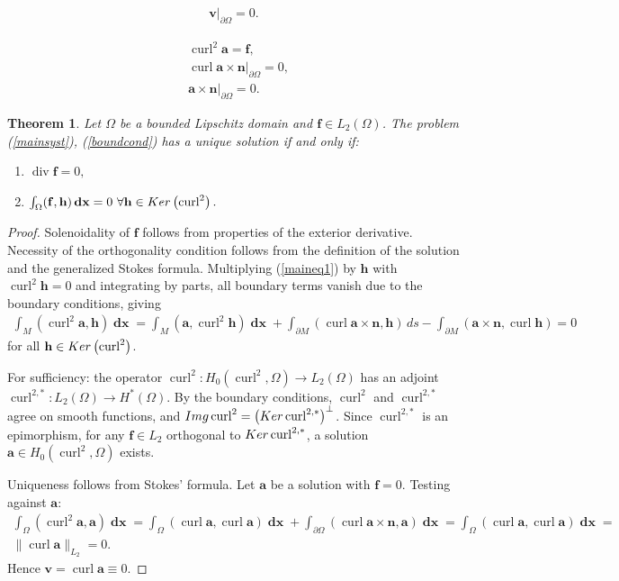\documentclass[10pt,a4paper]{amsart}
\newtheorem{theorem}{Theorem}
\newcommand{\Img}{{\rm Img}}
\newcommand{\Ker}{{\rm Ker}}
\newcommand{\ba}{\mathbf{a}}
\newcommand{\bff}{\mathbf{f}}
\newcommand{\bh}{\mathbf{h}}
\newcommand{\bn}{\mathbf{n}}
\newcommand{\bv}{\mathbf{v}}
\newcommand{\curl}{\operatorname{curl}}
\newcommand{\divv}{\operatorname{div}}
\newcommand{\dx}{\operatorname{\mathbf{dx}}}
\begin{document}
\begin{align}\label{boundcond}
\bv|_{\partial \Omega} = 0.
\end{align}

\begin{align}
&\curl^2 \ba = \bff, \label{maineq1} \\
&\curl \ba  \times \bn |_{\partial \Omega} = 0,\label{mainsystcond1}\\
&\ba  \times \bn |_{\partial \Omega} = 0.\label{mainsystcond2}
\end{align}

\begin{theorem}\label{mainTh}
Let $\Omega$ be a bounded Lipschitz domain and $\bff\in L_2(\Omega)$. The problem (\ref{mainsyst}), (\ref{boundcond}) has a unique solution if and only if:
\begin{enumerate}
\item $\divv \bff = 0,$
\item $\int_{\Omega} (\bff,\bh)\dx=0~\forall \bh \in \Ker \left ( \curl^2 \right ).$
\end{enumerate}
\end{theorem}

\begin{proof}
Solenoidality of $\bff$ follows from properties of the exterior derivative. Necessity of the orthogonality condition follows from the definition of the solution and the generalized Stokes formula. Multiplying (\ref{maineq1}) by $\bh$ with $\curl^2 \bh =0$ and integrating by parts, all boundary terms vanish due to the boundary conditions, giving
\begin{align*}
\int_M (\curl^2 \ba, \bh) \dx = 
\int_M (\ba, \curl^2 \bh) \dx +
\int_{\partial M} (\curl \ba \times \bn, \bh)\,ds - 
\int_{\partial M} (\ba \times \bn, \curl \bh) = 0
\end{align*}
for all $\bh \in \Ker \left ( \curl^2 \right )$.

For sufficiency: the operator $\curl^2: H_0(\curl^2,\Omega)\to L_2(\Omega)$ has an adjoint $\curl^{2,*}: L_2(\Omega) \to H^*(\Omega)$. By the boundary conditions, $\curl^2$ and $\curl^{2,*}$ agree on smooth functions, and $\Img \curl^2 = \left ( \Ker \curl^{2,*} \right )^\perp$. Since $\curl^{2,*}$ is an epimorphism, for any $\bff \in L_2$ orthogonal to $\Ker \curl^{2,*}$, a solution $\ba \in H_0(\curl^2,\Omega)$ exists.

Uniqueness follows from Stokes' formula. Let $\ba$ be a solution with $\bff=0$. Testing against $\ba$:
\begin{align*}
\int_\Omega (\curl^2 \ba,\ba) \dx= 
\int_\Omega (\curl \ba, \curl \ba) \dx + 
\int_{\partial \Omega} (\curl \ba \times \bn, \ba) \dx =
\int_\Omega (\curl \ba, \curl \ba) \dx = \\ \|\curl \ba\|_{L_2} = 0.
\end{align*}
Hence $\bv = \curl \ba \equiv 0$.  
\end{proof}
\end{document}
